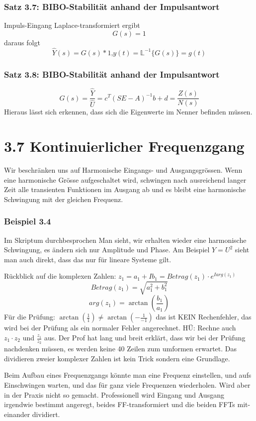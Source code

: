 \documentclass[a4paper]{article}
\begin{document}
\subsubsection*{Satz 3.7: BIBO-Stabilität anhand der Impulsantwort}
Impuls-Eingang Laplace-transformiert ergibt
\[ G(s)=1\]
daraus folgt
\[ \hat{Y}(s)=G(s)*1\text{,}y(t)=\mathbb{L}^{-1}\{G(s)\}=g(t) \]

\subsubsection*{Satz 3.8: BIBO-Stabilität anhand der Impulsantwort}
\[ G(s)=\frac{\hat{Y}}{\hat{U}}=c^{T}(SE-A)^{-1}b+d=\frac{Z(s)}{N(s)} \]
Hieraus lässt sich erkennen, dass sich die Eigenwerte im Nenner befinden müssen.

\section*{3.7 Kontinuierlicher Frequenzgang}
Wir beschränken uns auf Harmonische Eingangs- und Ausgangsgrössen. Wenn eine 
harmonische Grösse aufgeschaltet wird, schwingen nach ausreichend langer Zeit
alle transienten Funktionen im Ausgang ab und es bleibt eine harmonische
Schwingung mit der gleichen Frequenz.

\subsubsection*{Beispiel 3.4} Im Skriptum durchbesprochen
Man sieht, wir erhalten wieder eine harmonische Schwingung, es ändern sich nur 
Amplitude und Phase. Am Beispiel $Y=U^{2}$ sieht man auch direkt, dass das nur
für lineare Systeme gilt.

Rückblick auf die komplexen Zahlen: $z_{1}=a_{1}+Ib_{1}=Betrag(z_{1})\cdot e^{Iarg(z_{1})}$ 
\[ Betrag(z_{1})=\sqrt{a_{1}^{2}+b_{1}^{2}}  \]
\[ arg(z_{1}) =\arctan(\frac{b_{1}}{a_{1}})\]
Für die Prüfung: $\arctan(\frac{1}{1})\neq \arctan(-\frac{1}{-1})$ das ist KEIN
Rechenfehler, das wird bei der Prüfung als ein normaler Fehler angerechnet.\newline
HÜ: Rechne auch $z_{1}\cdot z_{2}$ und $\frac{z_{1}}{z_{2}}$ aus.
Der Prof hat lang und breit erklärt, dass wir bei der Prüfung nachdenken müssen,
es werden keine 40 Zeilen zum umformen erwartet. Das dividieren zweier komplexer
Zahlen ist kein Trick sondern eine Grundlage.

Beim Aufbau eines Frequenzgangs könnte man eine Frequenz einstellen, und aufs
Einschwingen warten, und das für ganz viele Frequenzen wiederholen. Wird aber
in der Praxis nicht so gemacht. Professionell wird Eingang und Ausgang
irgendwie bestimmt angeregt, beides FF-transformiert und die beiden FFTs mit-
einander dividiert.
\end{document}
